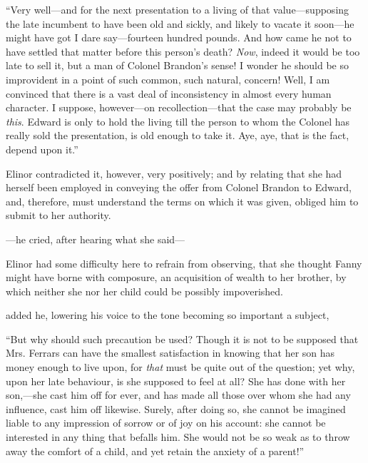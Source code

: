 
“Very well---and for the next presentation to a living of that value---supposing the late incumbent to have been old and sickly, and likely to vacate it soon---he might have got I dare say---fourteen hundred pounds. And how came he not to have settled that matter before this person's death? {\em Now}, indeed it would be too late to sell it, but a man of Colonel Brandon's sense! I wonder he should be so improvident in a point of such common, such natural, concern! Well, I am convinced that there is a vast deal of inconsistency in almost every human character. I suppose, however---on recollection---that the case may probably be {\em this}. Edward is only to hold the living till the person to whom the Colonel has really sold the presentation, is old enough to take it. Aye, aye, that is the fact, depend upon it.”

Elinor contradicted it, however, very positively; and by relating that she had herself been employed in conveying the offer from Colonel Brandon to Edward, and, therefore, must understand the terms on which it was given, obliged him to submit to her authority.

---he cried, after hearing what she said---



Elinor had some difficulty here to refrain from observing, that she thought Fanny might have borne with composure, an acquisition of wealth to her brother, by which neither she nor her child could be possibly impoverished.

 added he, lowering his voice to the tone becoming so important a subject, 

“But why should such precaution be used? Though it is not to be supposed that Mrs. Ferrars can have the smallest satisfaction in knowing that her son has money enough to live upon, for {\em that} must be quite out of the question; yet why, upon her late behaviour, is she supposed to feel at all? She has done with her son,---she cast him off for ever, and has made all those over whom she had any influence, cast him off likewise. Surely, after doing so, she cannot be imagined liable to any impression of sorrow or of joy on his account: she cannot be interested in any thing that befalls him. She would not be so weak as to throw away the comfort of a child, and yet retain the anxiety of a parent!”

